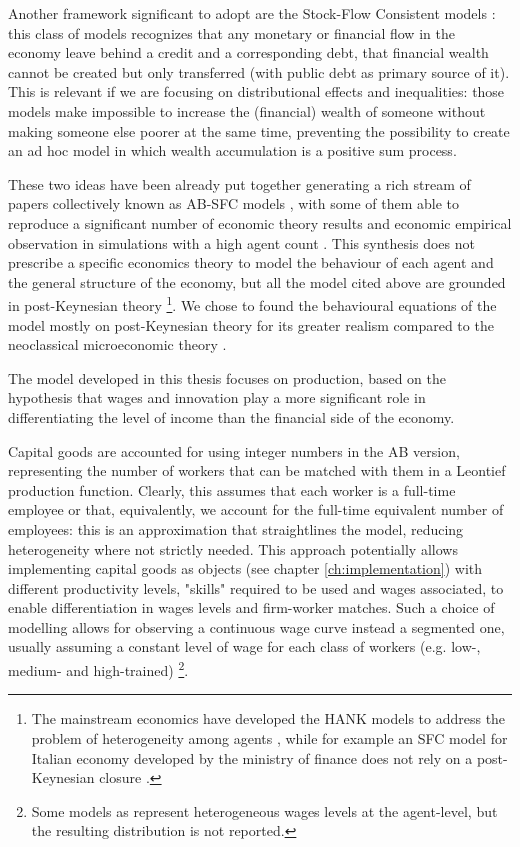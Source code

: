 Another framework significant to adopt are the Stock-Flow Consistent models \parencite{nikiforos2017,godley2012}: this class of models recognizes that any monetary or financial flow in the economy leave behind a credit and a corresponding debt, that financial wealth cannot be created but only transferred (with public debt as primary source of it).
This is relevant if we are focusing on distributional effects and inequalities: those models make impossible to increase the (financial) wealth of someone without making someone else poorer at the same time, preventing the possibility to create an ad hoc model in which wealth accumulation is a positive sum process.

These two ideas have been already put together generating a rich stream of papers collectively known as AB-SFC models \parencite{caverzasi2018}, with some of them able to reproduce a significant number of economic theory results and economic empirical observation in simulations with a high agent count \parencite[e.g.][]{caiani2016,reissl2024,dawid2019,dosi2010}.
This synthesis does not prescribe a specific economics theory to model the behaviour of each agent and the general structure of the economy, but all the model cited above are grounded in post-Keynesian theory \parencite{lavoie2022}\footnote{The mainstream economics have developed the HANK models to address the problem of heterogeneity among agents \parencite{violante2021}, while for example an SFC model for Italian economy developed by the ministry of finance does not rely on a post-Keynesian closure \parencite{barbierihermitte2023}.}.
We chose to found the behavioural equations of the model mostly on post-Keynesian theory for its greater realism compared to the neoclassical microeconomic theory \parencite{kirman1992,arnsperger2006}.

The model developed in this thesis focuses on production, based on the hypothesis that wages and innovation play a more significant role in differentiating the level of income than the financial side of the economy.

Capital goods are accounted for using integer numbers in the AB version, representing the number of workers that can be matched with them in a Leontief production function.
Clearly, this assumes that each worker is a full-time employee or that, equivalently, we account for the full-time equivalent number of employees: this is an approximation that straightlines the model, reducing heterogeneity where not strictly needed. 
This approach potentially allows implementing capital goods as objects (see chapter \ref{ch:implementation}) with different productivity levels, "skills" required to be used and wages associated, to enable differentiation in wages levels and firm-worker matches.
Such a choice of modelling allows for observing a continuous wage curve instead a segmented one, usually assuming a constant level of wage for each class of workers (e.g. low-, medium- and high-trained) \parencite{caiani2019b}\footnote{Some models as \textcite{dosi2021a} represent heterogeneous wages levels at the agent-level, but the resulting distribution is not reported.}.

